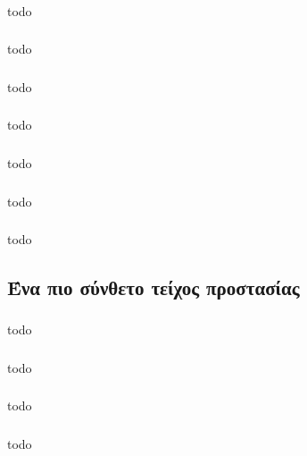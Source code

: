 \documentclass[a4paper, 12pt]{article}
\begin{document}
		\subsubsection{}
			todo

		\subsubsection{}
			todo

		\subsubsection{}
			todo

		\subsubsection{}
			todo

		\subsubsection{}
			todo

		\subsubsection{}
			todo

		\subsubsection{}
			todo

	\subsection{Ένα πιο σύνθετο τείχος προστασίας}

		\subsubsection{}
			todo

		\subsubsection{}
			todo

		\subsubsection{}
			todo

		\subsubsection{}
			todo
\end{document}
